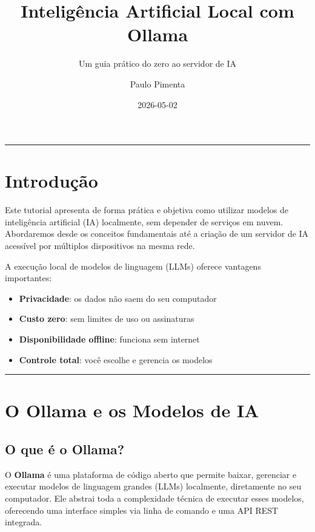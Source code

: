 \documentclass[
]{article}
\title{Inteligência Artificial Local com Ollama}
\subtitle{Um guia prático do zero ao servidor de IA}
\author{Paulo Pimenta}
\date{2026-05-02}
\providecommand{\tightlist}{%
  \setlength{\itemsep}{0pt}\setlength{\parskip}{0pt}}
\begin{document}
\maketitle

{
\setcounter{tocdepth}{3}
\tableofcontents
}
\begin{center}\rule{0.5\linewidth}{0.5pt}\end{center}

\section{Introdução}\label{introduuxe7uxe3o}

Este tutorial apresenta de forma prática e objetiva como utilizar
modelos de inteligência artificial (IA) localmente, sem depender de
serviços em nuvem. Abordaremos desde os conceitos fundamentais até a
criação de um servidor de IA acessível por múltiplos dispositivos na
mesma rede.

A execução local de modelos de linguagem (LLMs) oferece vantagens
importantes:

\begin{itemize}
\tightlist
\item
  \textbf{Privacidade}: os dados não saem do seu computador
\item
  \textbf{Custo zero}: sem limites de uso ou assinaturas
\item
  \textbf{Disponibilidade offline}: funciona sem internet
\item
  \textbf{Controle total}: você escolhe e gerencia os modelos
\end{itemize}

\begin{center}\rule{0.5\linewidth}{0.5pt}\end{center}

\section{O Ollama e os Modelos de IA}\label{o-ollama-e-os-modelos-de-ia}

\subsection{O que é o Ollama?}\label{o-que-uxe9-o-ollama}

O \textbf{Ollama} é uma plataforma de código aberto que permite baixar,
gerenciar e executar modelos de linguagem grandes (LLMs) localmente,
diretamente no seu computador. Ele abstrai toda a complexidade técnica
de executar esses modelos, oferecendo uma interface simples via linha de
comando e uma API REST integrada.
\end{document}
